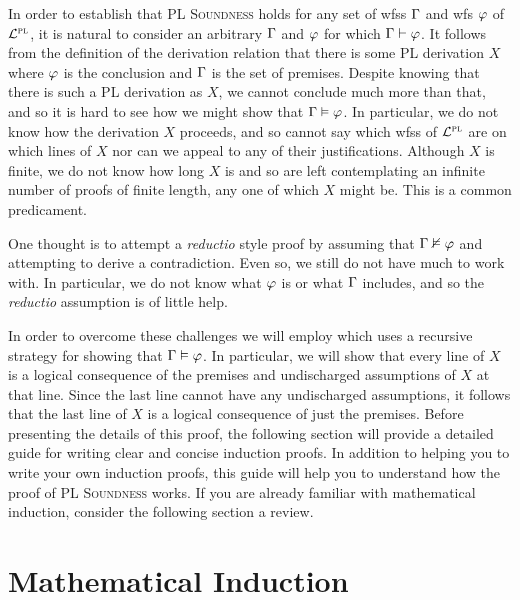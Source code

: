In order to establish that \textsc{PL Soundness} holds for any set of wfss $\Gamma$ and wfs $\varphi$ of $\mathcal{L}^{\textsc{pl}}$, it is natural to consider an arbitrary $\Gamma$ and $\varphi$ for which $\Gamma \vdash \varphi$. 
It follows from the definition of the derivation relation that there is some PL derivation $X$ where $\varphi$ is the conclusion and $\Gamma$ is the set of premises. 
Despite knowing that there is such a PL derivation as $X$, we cannot conclude much more than that, and so it is hard to see how we might show that $\Gamma \vDash \varphi$.
In particular, we do not know how the derivation $X$ proceeds, and so cannot say which wfss of $\mathcal{L}^{\textsc{pl}}$ are on which lines of $X$ nor can we appeal to any of their justifications.
Although $X$ is finite, we do not know how long $X$ is and so are left contemplating an infinite number of proofs of finite length, any one of which $X$ might be. 
This is a common predicament.

One thought is to attempt a \textit{reductio} style proof by assuming that $\Gamma \nvDash \varphi$ and attempting to derive a contradiction. 
Even so, we still do not have much to work with.
In particular, we do not know what $\varphi$ is or what $\Gamma$ includes, and so the \textit{reductio} assumption is of little help.

In order to overcome these challenges we will employ  which uses a recursive strategy for showing that $\Gamma \vDash \varphi$.
In particular, we will show that every line of $X$ is a logical consequence of the premises and undischarged assumptions of $X$ at that line.
Since the last line cannot have any undischarged assumptions, it follows that the last line of $X$ is a logical consequence of just the premises.
Before presenting the details of this proof, the following section will provide a detailed guide for writing clear and concise induction proofs.
In addition to helping you to write your own induction proofs, this guide will help you to understand how the proof of \textsc{PL Soundness} works.
If you are already familiar with mathematical induction, consider the following section a review.







\section{Mathematical Induction}

